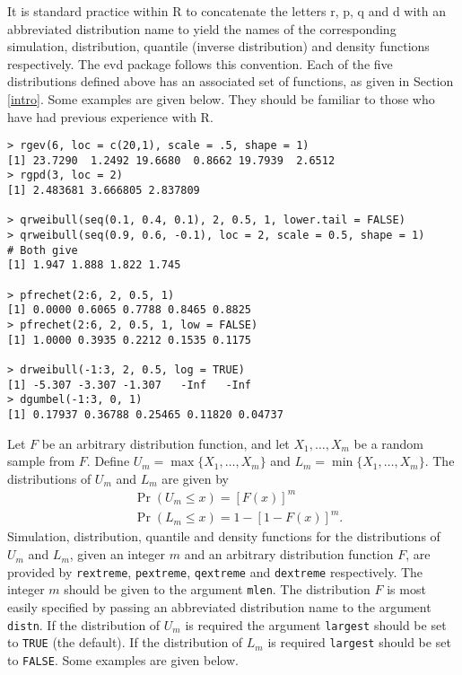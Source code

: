 \documentclass[11pt,a4paper]{article}
\begin{document}
It is standard practice within R to concatenate the letters r, p, q and d with an abbreviated distribution name to yield the names of the corresponding simulation, distribution, quantile (inverse distribution) and density functions respectively.
The evd package follows this convention.
Each of the five distributions defined above has an associated set of functions, as given in Section \ref{intro}. Some examples are given below.
They should be familiar to those who have had previous experience with R.

\begin{verbatim}
> rgev(6, loc = c(20,1), scale = .5, shape = 1)
[1] 23.7290  1.2492 19.6680  0.8662 19.7939  2.6512
> rgpd(3, loc = 2)
[1] 2.483681 3.666805 2.837809

> qrweibull(seq(0.1, 0.4, 0.1), 2, 0.5, 1, lower.tail = FALSE)
> qrweibull(seq(0.9, 0.6, -0.1), loc = 2, scale = 0.5, shape = 1)
# Both give
[1] 1.947 1.888 1.822 1.745

> pfrechet(2:6, 2, 0.5, 1)
[1] 0.0000 0.6065 0.7788 0.8465 0.8825
> pfrechet(2:6, 2, 0.5, 1, low = FALSE)
[1] 1.0000 0.3935 0.2212 0.1535 0.1175

> drweibull(-1:3, 2, 0.5, log = TRUE)
[1] -5.307 -3.307 -1.307   -Inf   -Inf
> dgumbel(-1:3, 0, 1)
[1] 0.17937 0.36788 0.25465 0.11820 0.04737
\end{verbatim}

Let $F$ be an arbitrary distribution function, and let $X_1,\dots,X_m$ be a random sample from $F$.
Define $U_m=\max\{X_1,\dots,X_m\}$ and $L_m=\min\{X_1,\dots,X_m\}$.
The distributions of $U_m$ and $L_m$ are given by
\begin{align}
&\Pr(U_m \leq x) = [F(x)]^m 
\label{maxdens} \\
&\Pr(L_m \leq x) = 1 - [1 - F(x)]^m.
\label{mindens}
\end{align}
Simulation, distribution, quantile and density functions for the distributions of $U_m$ and $L_m$, given an integer $m$ and an arbitrary distribution function $F$, are provided by \verb+rextreme+, \verb+pextreme+, \verb+qextreme+ and \verb+dextreme+ respectively.
The integer $m$ should be given to the argument \verb+mlen+.
The distribution $F$ is most easily specified by passing an
abbreviated distribution name to the argument \verb+distn+.
If the distribution of $U_m$ is required the argument \verb+largest+
should be set to \verb+TRUE+ (the default). 
If the distribution of $L_m$ is required \verb+largest+ should be set
to \verb+FALSE+. 
Some examples are given below.
\end{document}
